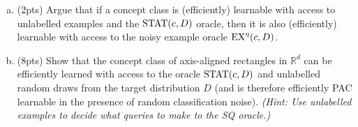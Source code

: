 \documentclass[11pt]{article}
\newcommand{\blue}[1]{{\color{blue}#1}}
\newcommand{\R}{\mathbb{R}}
\newcommand{\exampleoracle}{{\text{\rm EX}}}
\newcommand{\statoracle}{{\text{\rm STAT}}}
\begin{document}
\begin{enumerate}[(a)]
    \item  (\blue{2pts}) Argue that if a concept class is (efficiently) learnable with access to unlabelled examples and the $\statoracle(c,D)$ oracle, then it is also (efficiently) learnable with access to the noisy example oracle $\exampleoracle^{\eta}(c,D)$.
    \item  (\blue{8pts}) Show that the concept class of axis-aligned rectangles in $\R^d$ can be efficiently learned with access to the oracle $\statoracle(c,D)$  and {unlabelled} random draws from the target distribution $D$ (and is therefore efficiently PAC learnable in the presence of random classification noise). \emph{(Hint: Use unlabelled examples to decide what queries to make to the SQ oracle.)}
\end{enumerate}





\end{document}
